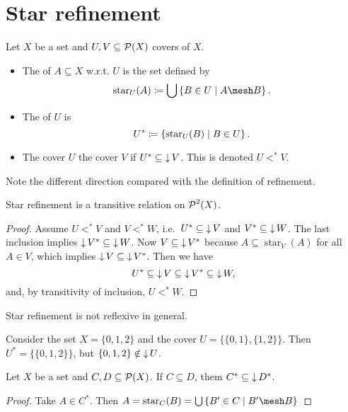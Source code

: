 \section{Star refinement}
\begin{definition}
Let $X$ be a set and $U,V\subseteq \operatorname{\mathcal{P}}(X)$ covers of $X$.
\begin{itemize}
\item The  of $A\subseteq X$ w.r.t. $U$ is the set defined by
\[ \operatorname{star}_U(A) \defeq \bigcup\setbuilder{B\in U}{A\mesh B}. \]
\item The  of $U$ is
\[ U^* \coloneqq \left\{ \operatorname{star}_U(B) \;\middle|\; B\in U \right\}. \]
\item The cover $U$  the cover $V$ if $U^*\subseteq \operatorname{\downarrow} V$. This is denoted $U <^* V$.
\end{itemize}
\end{definition}
Note the different direction compared with the definition of refinement.

\begin{lemma}
Star refinement is a transitive relation on $\operatorname{\mathcal{P}}^2(X)$.
\end{lemma}
\begin{proof}
Assume $U <^* V$ and $V<^* W$, i.e.\ $U^* \subseteq \operatorname{\downarrow} V$ and $V^* \subseteq \operatorname{\downarrow} W$. The last inclusion implies $\operatorname{\downarrow} V^* \subseteq \operatorname{\downarrow} W$. Now $V\subseteq \operatorname{\downarrow} V^*$ because $A\subseteq \operatorname{star}_V(A)$ for all $A\in V$, which implies $\operatorname{\downarrow} V\subseteq \operatorname{\downarrow} V^*$. Then we have
\[ U^* \subseteq \operatorname{\downarrow} V \subseteq \operatorname{\downarrow} V^* \subseteq \operatorname{\downarrow} W, \]
and, by transitivity of inclusion, $U <^* W$.
\end{proof}

\begin{example}
Star refinement is not reflexive in general. 

Consider the set $X = \{0,1,2\}$ and the cover $U = \big\{\{0,1\}, \{1,2\}\big\}$. Then $U^* = \big\{\{0,1,2\}\big\}$, but $\{0,1,2\}\notin \operatorname{\downarrow} U$.
\end{example}

\begin{lemma}
Let $X$ be a set and $C,D\subseteq \operatorname{\mathcal{P}}(X)$. If $C\subseteq D$, them $C^*\subseteq \operatorname{\downarrow} D^*$.
\end{lemma}
\begin{proof}
Take $A \in C^*$. Then $A = \operatorname{star}_C(B) = \bigcup \setbuilder{B'\in C}{B'\mesh B}$
\end{proof}

